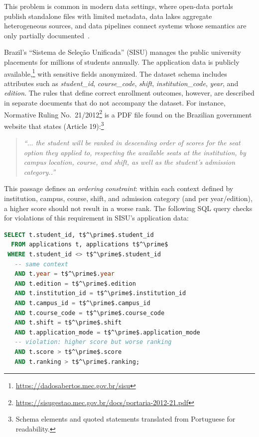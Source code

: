 This problem is common in modern data settings, where open-data portals publish standalone files with limited metadata, data lakes aggregate heterogeneous sources, and data pipelines connect systems whose semantics are only partially documented~\cite{datasetSearch2020,Governor2023}.


\begin{example}
\label{ex:intro}
Brazil's ``Sistema de Sele\c{c}\~{a}o Unificada'' (SISU) manages the public university placements for millions of students annually. The application data is publicly available,\footnote{\url{https://dadosabertos.mec.gov.br/sisu}} with sensitive fields anonymized. The dataset schema includes attributes such as \emph{student\_id}, \emph{course\_code}, \emph{shift}, \emph{institution\_code}, \emph{year}, and \emph{edition}. The rules that define correct enrollment outcomes, however, are described in separate documents that do not accompany the dataset. For instance, Normative Ruling No.\ 21/2012\footnote{\url{https://sisugestao.mec.gov.br/docs/portaria-2012-21.pdf}} is a PDF file found on the Brazilian government website that states (Article 19):\footnote{Schema elements and quoted statements translated from Portuguese for readability.}

\begin{quote}
\textit{``$\ldots$ the student will be ranked in descending order of scores for the seat option they applied to, respecting the available seats at the institution, by campus location, course, and shift, as well as the student's admission category..''}
\end{quote}

This passage defines an \emph{ordering constraint}: within each context defined by institution, campus, course, shift, and admission category (and per year/edition), a higher score should not result in a worse rank. The following SQL query checks for violations of this requirement in SISU's application data:

\begin{lstlisting}[language=SQL, frame=none, basicstyle=\footnotesize\ttfamily, mathescape]
SELECT t.student_id, t$^\prime$.student_id
  FROM applications t, applications t$^\prime$
 WHERE t.student_id <> t$^\prime$.student_id
   -- same context
   AND t.year = t$^\prime$.year
   AND t.edition = t$^\prime$.edition
   AND t.institution_id = t$^\prime$.institution_id
   AND t.campus_id = t$^\prime$.campus_id
   AND t.course_code = t$^\prime$.course_code
   AND t.shift = t$^\prime$.shift
   AND t.application_mode = t$^\prime$.application_mode
   -- violation: higher score but worse ranking
   AND t.score > t$^\prime$.score
   AND t.ranking > t$^\prime$.ranking;
\end{lstlisting}


\end{example}
